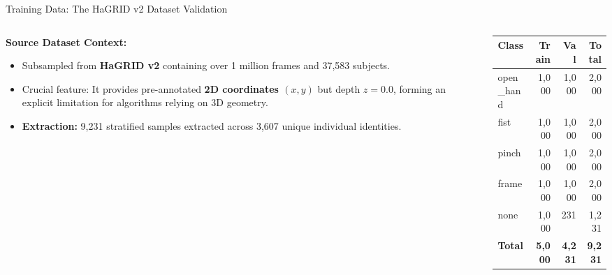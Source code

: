\documentclass[10pt, aspectratio=169]{beamer}
\begin{document}
\begin{frame}{Training Data: The HaGRID v2 Dataset Validation}
    \begin{columns}
        \begin{column}{0.5\textwidth}
            \textbf{Source Dataset Context:}
            \begin{itemize}
                \item Subsampled from \textbf{HaGRID v2} containing over 1 million frames and 37,583 subjects.
                \item Crucial feature: It provides pre-annotated \textbf{2D coordinates $(x,y)$} but depth $z=0.0$, forming an explicit limitation for algorithms relying on 3D geometry.
                \item \textbf{Extraction:} 9,231 stratified samples extracted across 3,607 unique individual identities.
            \end{itemize}
        \end{column}
        \begin{column}{0.5\textwidth}
            \centering
            \begin{table}
                \begin{tabular}{@{}lrrr@{}}
                    \toprule
                    \textbf{Class} & \textbf{Train} & \textbf{Val} & \textbf{Total} \\
                    \midrule
                    open\_hand & 1,000 & 1,000 & 2,000 \\
                    fist & 1,000 & 1,000 & 2,000 \\
                    pinch & 1,000 & 1,000 & 2,000 \\
                    frame & 1,000 & 1,000 & 2,000 \\
                    none & 1,000 & 231 & 1,231 \\
                    \midrule
                    \textbf{Total} & \textbf{5,000} & \textbf{4,231} & \textbf{9,231} \\
                    \bottomrule
                \end{tabular}
            \end{table}
        \end{column}
    \end{columns}
\end{frame}
\end{document}
